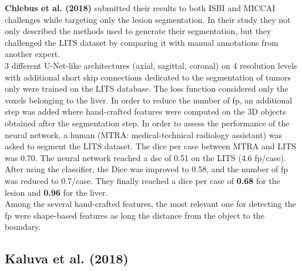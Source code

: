 \textbf{Chlebus et al. (2018)} submitted their results to both ISBI and
MICCAI challenges while targeting only the lesion segmentation. In their
study they not only described the methods used to generate their
segmentation, but they challenged the LITS dataset by comparing it with
manual annotations from another expert.\\
3 different U-Net-like architectures (axial, sagittal, coronal) on 4
resolution levels with additional short skip connections dedicated to
the segmentation of tumors only were trained on the LITS database. The
loss function considered only the voxels belonging to the liver. In
order to reduce the number of \ac{fp}, an additional step was added where
hand-crafted features were computed on the 3D objects obtained after the
segmentation step. In order to assess the performance of the neural
network, a human (MTRA: medical-technical radiology assistant) was asked
to segment the LITS dataset. The dice per case between MTRA and LITS was
0.70. The neural network reached a \ac{dsc} of 0.51 on the LITS (4.6
\ac{fp}/case). After using the classifier, the Dice was improved to 0.58, and
the number of \ac{fp} was reduced to 0.7/case. They finally reached a dice
per case of \textbf{0.68} for the lesion and \textbf{0.96} for the
liver.\\
Among the several hand-crafted features, the most relevant one for
detecting the \ac{fp} were shape-based features as long the distance from the
object to the boundary.

\subsection*{Kaluva et al. (2018)}\label{kaluva-et-al.-2018}

